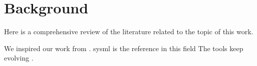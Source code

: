 \chapter{Background}
\label{cap:background}

Here is a comprehensive review of the literature related to the topic of this work.

We inspired our work from \citet{Chakrabarti2014}.
\acrshort{sysml} is the reference in this field \citep{ObjectManagementGroup2015}
The tools keep evolving \citep{Skoltech2017}.

